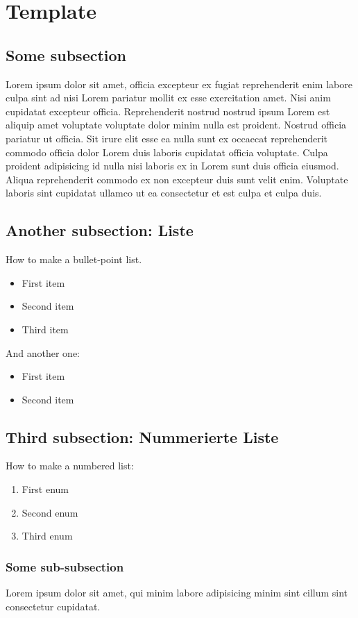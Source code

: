 

\section{Template}
\subsection{Some subsection}
Lorem ipsum dolor sit amet, officia excepteur ex fugiat reprehenderit enim labore culpa sint ad nisi Lorem pariatur mollit ex esse exercitation amet. Nisi anim cupidatat excepteur officia. Reprehenderit nostrud nostrud ipsum Lorem est aliquip amet voluptate voluptate dolor minim nulla est proident. Nostrud officia pariatur ut officia. Sit irure elit esse ea nulla sunt ex occaecat reprehenderit commodo officia dolor Lorem duis laboris cupidatat officia voluptate. Culpa proident adipisicing id nulla nisi laboris ex in Lorem sunt duis officia eiusmod. Aliqua reprehenderit commodo ex non excepteur duis sunt velit enim. Voluptate laboris sint cupidatat ullamco ut ea consectetur et est culpa et culpa duis.

\subsection{Another subsection: Liste}
How to make a bullet-point list.
\begin{itemize}
    \item First item
    \item Second item
    \item Third item
\end{itemize}

 And another one:
 
\begin{itemize}
    \item First item
    \item Second item
\end{itemize}
\subsection{Third subsection: Nummerierte Liste}
How to make a numbered list:
\begin{enumerate}
    \item First enum
    \item Second enum
    \item Third enum
\end{enumerate}
\subsubsection{Some sub-subsection}
Lorem ipsum dolor sit amet, qui minim labore adipisicing minim sint cillum sint consectetur cupidatat.



